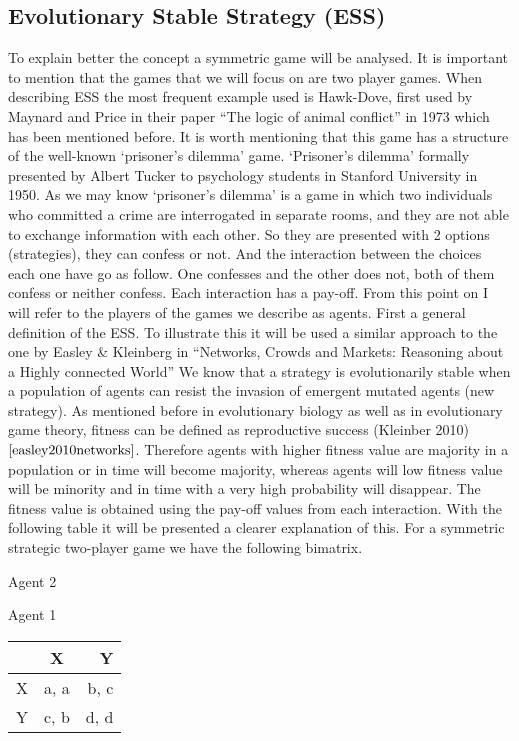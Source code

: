 \documentclass{article}
\begin{document}
\subsection{Evolutionary Stable Strategy (ESS)}
To explain better the concept a symmetric game will be analysed. It is important to mention that the games that we will focus on are two player games. 
When describing ESS the most frequent example used is Hawk-Dove, first used by Maynard and Price in their paper ``The logic of animal conflict'' in 1973 which has been mentioned before. It is worth mentioning that this game has a structure of the well-known ‘prisoner’s dilemma’ game. `Prisoner’s dilemma’ formally presented by Albert Tucker to psychology students in Stanford University in 1950. As we may know ‘prisoner’s dilemma’ is a game in which two individuals who committed a crime are interrogated in separate rooms, and they are not able to exchange information with each other. So they are presented with 2 options (strategies), they can confess or not. And the interaction between the choices each one have go as follow. One confesses and the other does not, both of them confess or neither confess. Each interaction has a pay-off. From this point on I will refer to the players of the games we describe as agents.
First a general definition of the ESS. To illustrate this it will be used a similar approach to the one by Easley \& Kleinberg in ``Networks, Crowds and Markets: Reasoning about a Highly connected World''
We know that a strategy is evolutionarily stable when a population of agents can resist the invasion of emergent mutated agents (new strategy). As mentioned before in evolutionary biology as well as in evolutionary game theory, fitness can be defined as reproductive success (Kleinber 2010)$\cite{easley2010networks}$. Therefore agents with higher fitness value are majority in a population or in time will become majority, whereas agents will low fitness value will be minority and in time with a very high probability will disappear. The fitness value is obtained using the pay-off values from each interaction. With the following table it will be presented a clearer explanation of this.
For a symmetric strategic two-player game we have the following bimatrix.
\begin{center}
Agent 2

Agent 1
\begin{tabular}{|l|c|r|}
\hline
 & X & Y\\ 
\hline
X & a, a & b, c\\
\hline
Y & c, b & d, d\\
\hline
\end{tabular}
\end{center}
\end{document}
